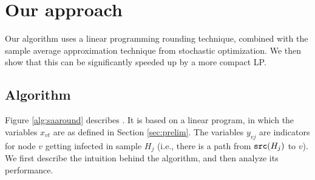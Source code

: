 
\section{Our approach}
\label{sec:method}

Our algorithm \algo{} uses a linear programming rounding technique, combined with the sample average approximation
technique from stochastic optimization. We then show that this can be significantly speeded up by a more compact LP.

\subsection{Algorithm \algo{}}


Figure \ref{alg:saaround} describes \algo{}. It is based on a linear program, in which the variables $x_{vt}$
are as defined in Section \ref{sec:prelim}. The variables $y_{vj}$ are indicators for node $v$ getting infected
in sample $H_j$ (i.e., there is a path from $\texttt{src}(H_j)$ to $v$).
We first describe the intuition behind the algorithm, and then analyze its performance.


